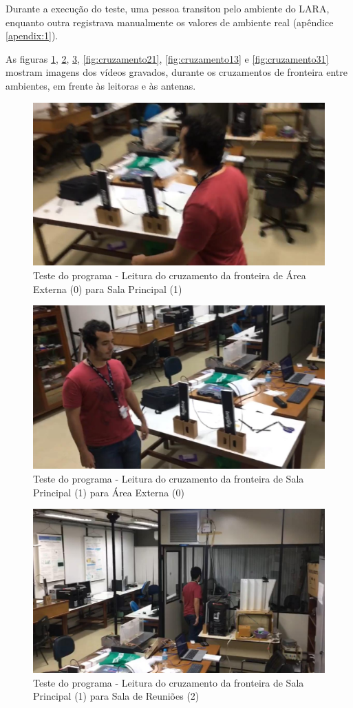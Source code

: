Durante a execução do teste, uma pessoa transitou pelo ambiente do LARA, enquanto outra registrava manualmente os valores de ambiente real (apêndice \ref{apendix:1}).

As figuras \ref{fig:cruzamento01}, \ref{fig:cruzamento10}, \ref{fig:cruzamento12}, \ref{fig:cruzamento21}, \ref{fig:cruzamento13} e \ref{fig:cruzamento31} mostram imagens dos vídeos gravados, durante os cruzamentos de fronteira entre ambientes, em frente às leitoras e às antenas.


\begin{figure}[H]
    \centering
    \includegraphics[width=0.5\linewidth]{figs/Resultados/cruzamento01.jpeg}
    \caption{Teste do programa - Leitura do cruzamento da fronteira de Área Externa (0) para Sala Principal (1)}
    \label{fig:cruzamento01}
\end{figure}

\begin{figure}[H]
    \centering
    \includegraphics[width=0.5\linewidth]{figs/Resultados/cruzamento10.jpeg}
    \caption{Teste do programa - Leitura do cruzamento da fronteira de Sala Principal (1) para Área Externa (0)}
    \label{fig:cruzamento10}
\end{figure}

\begin{figure}[H]
    \centering
    \includegraphics[width=0.5\linewidth]{figs/Resultados/cruzamento12.jpeg}
    \caption{Teste do programa - Leitura do cruzamento da fronteira de Sala Principal (1) para Sala de Reuniões (2)}
    \label{fig:cruzamento12}
\end{figure}

